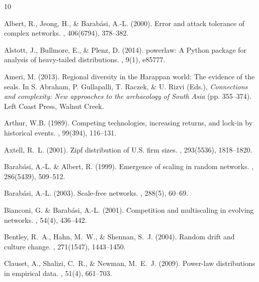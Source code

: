\documentclass[12pt]{article}
\begin{document}
\begin{thebibliography}{10}

Albert, R., Jeong, H., \& Barab{\'a}si, A.-L. (2000).
\newblock Error and attack tolerance of complex networks.
, 406(6794), 378--382.

Alstott, J., Bullmore, E., \& Plenz, D. (2014).
\newblock powerlaw: A Python package for analysis of heavy-tailed distributions.
, 9(1), e85777.

Ameri, M. (2013).
\newblock Regional diversity in the {H}arappan world: {T}he evidence of the seals.
\newblock In S. Abraham, P. Gullapalli, T. Raczek, \& U. Rizvi (Eds.), {\em Connections and complexity: New approaches to the archaeology of {S}outh {A}sia} (pp. 355--374).
\newblock Left Coast Press, Walnut Creek.

Arthur, W.B. (1989).
\newblock Competing technologies, increasing returns, and lock-in by historical
events.
, 99(394), 116--131.

Axtell, R.~L. (2001).
\newblock Zipf distribution of U.S. firm sizes.
, 293(5536), 1818--1820.

Barab{\'a}si, A.-L. \& Albert, R. (1999).
\newblock Emergence of scaling in random networks.
, 286(5439), 509--512.

Barab{\'a}si, A.-L. (2003).
\newblock Scale-free networks.
, 288(5), 60--69.

Bianconi, G. \& Barab{\'a}si, A.-L. (2001).
\newblock Competition and multiscaling in evolving networks.
, 54(4), 436--442.

Bentley, R.~A., Hahn, M.~W., \& Shennan, S.~J. (2004).
\newblock Random drift and culture change.
, 271(1547), 1443--1450.

Clauset, A., Shalizi, C.~R., \& Newman, M.~E.~J. (2009).
\newblock Power-law distributions in empirical data.
, 51(4), 661--703.


\end{thebibliography}
\end{document}
